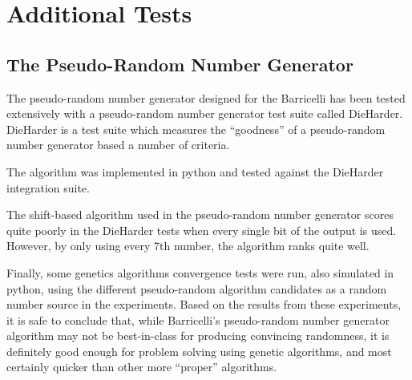 
\section{Additional Tests}

\subsection{The Pseudo-Random Number Generator}


The pseudo-random number generator designed for the Barricelli has been tested extensively with a pseudo-random number generator test suite called DieHarder\cn.
DieHarder is a test suite which measures the ``goodness'' of a pseudo-random number generator based a number of criteria.

The algorithm was implemented in python and tested against the DieHarder integration suite\cn.

The shift-based algorithm used in the pseudo-random number generator scores quite poorly in the DieHarder tests when every single bit of the output is used.
However, by only using every 7th number\cn, the algorithm ranks quite well.

Finally, some genetics algorithms convergence tests were run, also simulated in python, using the different pseudo-random algorithm candidates as a random number source in the experiments.
Based on the results from these experiments, it is safe to conclude that, while Barricelli's pseudo-random number generator algorithm may not be best-in-class for producing convincing randomness, it is definitely good enough for problem solving using genetic algorithms, and most certainly quicker than other more ``proper'' algorithms.




